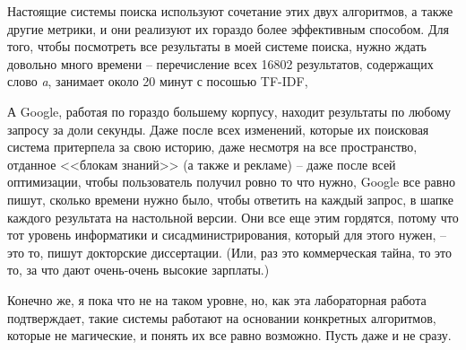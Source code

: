 \documentclass[a4page]{article}
\let\Oldsection\section
\renewcommand{\section}{\FloatBarrier\Oldsection}
\begin{document}
Настоящие системы поиска используют сочетание этих двух алгоритмов, а также другие метрики, и они реализуют их гораздо более эффективным способом. Для того, чтобы посмотреть все результаты в моей системе поиска, нужно ждать довольно много времени -- перечисление всех 16802 результатов, содержащих слово \textit{a}, занимает около 20 минут с посошью TF-IDF, 

А Google, работая по гораздо большему корпусу, находит результаты по любому запросу за доли секунды. Даже после всех изменений, которые их поисковая система притерпела за свою историю, даже несмотря на все пространство, отданное <<блокам знаний>> (а также и рекламе) -- даже после всей оптимизации, чтобы пользователь получил ровно то что нужно, Google все равно пишут, сколько времени нужно было, чтобы ответить на каждый запрос, в шапке каждого результата на настольной версии. Они все еще этим гордятся, потому что тот уровень информатики и сисадминистрирования, который для этого нужен, -- это то, пишут докторские диссертации. (Или, раз это коммерческая тайна, то это то, за что дают очень-очень высокие зарплаты.)

Конечно же, я пока что не на таком уровне, но, как эта лабораторная работа подтверждает, такие системы работают на основании конкретных алгоритмов, которые не магические, и понять их все равно возможно. Пусть даже и не сразу.

\end{document}
